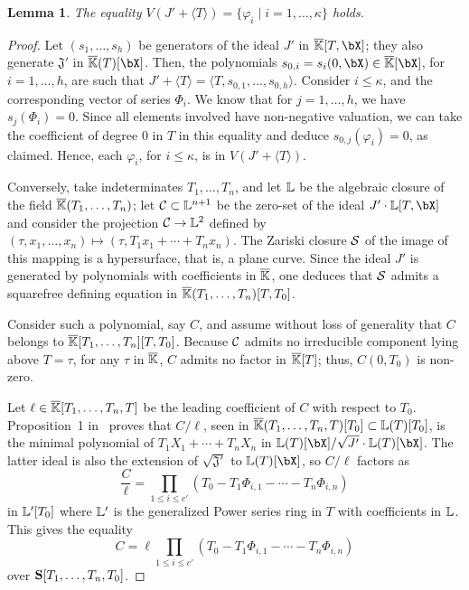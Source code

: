 \documentclass[12pt]{article}
\newtheorem{lemma}[definition]{Lemma}
\begin{document}
\begin{lemma}\label{lemma:Z1}
  The equality $V(J' +\langle T \rangle)=\{\varphi_i \mid i=1,\dots,\kappa\}$ holds.
\end{lemma}
\begin{proof}
  Let $(s_1,\dots,s_h)$ be generators of the ideal $J'$ in
  $\KKbar[T,\bX]$; they also generate $\mathfrak{J}'$ in
  $\KKbar(T)[\bX]$. Then, the polynomials
  $s_{0,i}=s_i(0,\bX) \in \KKbar[\bX]$, for $i=1,\dots,h$, are such
  that
  $J'+\langle T\rangle = \langle T,s_{0,1},\dots,s_{0,h} \rangle$.
  Consider $i \le \kappa$, and the corresponding vector of series
  $\Phi_i$. We know that for $j=1,\dots,h$, we have $s_j(\Phi_i)=0$.
  Since all elements involved have non-negative valuation, we can take
  the coefficient of degree $0$ in $T$ in this equality and deduce
  $s_{0,j}(\varphi_i)=0$, as claimed. Hence, each $\varphi_i$, for
  $i \le \kappa$, is in $V(J' + \langle T \rangle)$.

  Conversely, take indeterminates $T_1,\dots,T_n$, and let $\mathbb{L}$ be
  the algebraic closure of the field $\overline{\mathbb{K}}(T_1,\dots,T_n)$; let
  ${\cal C}\subset{\ensuremath{\mathbb{L}}}{}^{n+1}$ be the zero-set of the ideal $J'\cdot
  \LL[T,\bX]$ and consider the projection ${\cal C} \to {\ensuremath{\mathbb{L}}}{}^2$
  defined by $(\tau,x_1,\dots,x_n)\mapsto (\tau,T_1 x_1 + \cdots + T_n
  x_n)$. The Zariski closure ${\cal S}$ of the image of this mapping
  is a hypersurface, that is, a plane curve.  Since the ideal $J'$ is generated by polynomials
  with coefficients in $\overline{\mathbb{K}}$, one deduces that ${\cal S}$ admits a squarefree
  defining equation in $\overline{\mathbb{K}}(T_1,\dots,T_n)[T,T_0]$.

  Consider such a polynomial, say $C$, and assume without loss of
  generality that $C$ belongs to 
  $\overline{\mathbb{K}}[T_1,\dots,T_n][T,T_0]$. Because ${\cal C}$ admits no irreducible
  component lying above $T=\tau$, for any $\tau$ in $\overline{\mathbb{K}}$, $C$
  admits no factor in $\overline{\mathbb{K}}[T]$; thus, $C(0,T_0)$ is non-zero.

  Let $\ell \in \overline{\mathbb{K}}[T_1,\dots,T_n,T]$ be the leading coefficient of
  $C$ with respect to $T_0$. Proposition~1 in~\cite{Schost03} proves
  that $C/\ell$, seen in $\overline{\mathbb{K}}(T_1,\dots,T_n,T)[T_0] \subset
  \mathbb{L}(T)[T_0]$, is the minimal polynomial of $T_1 X_1 + \cdots +
  T_n X_n$ in $\LL(T)[\bX]/\sqrt{J'}\cdot \LL(T)[\bX]$. The latter ideal
  is also the extension of $\sqrt{\mathfrak{J}'}$ to $\LL(T)[\bX]$, 
  so $C/\ell$ factors as
  $$\frac C\ell = \prod_{1\le i \le c'}(T_0-T_1 \Phi_{i,1} - \cdots - T_n \Phi_{i,n})$$
  in $\mathbb{L}' [T_0]$ where $\mathbb{L}'$ is the generalized Power
  series ring in $T$ with coefficients in $\mathbb{L}$.  This gives the
  equality
  $$C =\ell \prod_{1\le i \le  c'}(T_0-T_1 \Phi_{i,1} - \cdots - T_n
  \Phi_{i,n})$$ over $\mathbf{S}[T_1,\dots,T_n,T_0]$. 


\end{proof}
\end{document}
